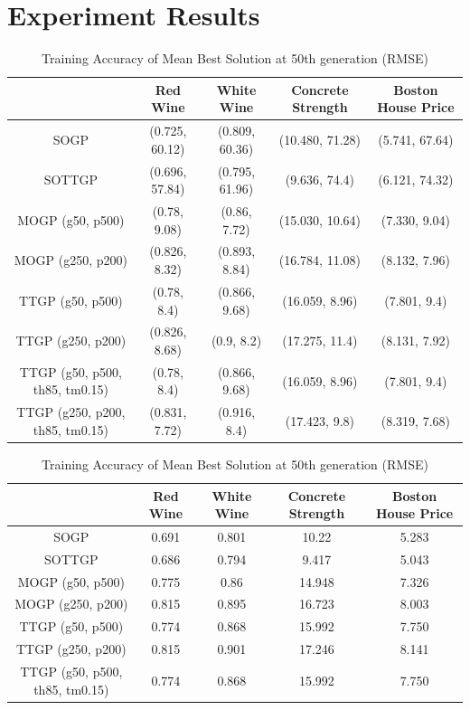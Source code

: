 \documentclass[a4paper, twocolumn]{article}
\begin{document}
\section{Experiment Results}
\begin{table}[!htb]
	\begin{center}
		\caption{Mean Best Solution at 50th generation (RMSE, tree size)}
		\label{table:1}
		\begin{tabular}{ c|cccc }
			& Red Wine & White Wine & Concrete Strength & Boston House Price\\
			\hline
			SOGP &(0.725, 60.12)&(0.809, 60.36)&(10.480, 71.28)&(5.741, 67.64)\\
			SOTTGP &(0.696, 57.84)&(0.795, 61.96)&(9.636, 74.4)&(6.121, 74.32)\\
			MOGP (g50, p500) &(0.78, 9.08)&(0.86, 7.72)&(15.030, 10.64)&(7.330, 9.04)\\
			MOGP (g250, p200) &(0.826, 8.32)&(0.893, 8.84)&(16.784, 11.08)&(8.132, 7.96)\\
			TTGP (g50, p500) &(0.78, 8.4)&(0.866, 9.68)&(16.059, 8.96)&(7.801, 9.4)\\
			TTGP (g250, p200) &(0.826, 8.68)&(0.9, 8.2)&(17.275, 11.4)&(8.131, 7.92)\\
			TTGP (g50, p500, th85, tm0.15) &(0.78, 8.4)&(0.866, 9.68)&(16.059, 8.96)&(7.801, 9.4)\\
			TTGP (g250, p200, th85, tm0.15) &(0.831, 7.72)&(0.916, 8.4)&(17.423, 9.8)&(8.319, 7.68)\\
		\end{tabular}
	\end{center}
	\begin{center}
		\caption{Training Accuracy of Mean Best Solution at 50th generation (RMSE)}
		\label{table:2}
		\begin{tabular}{ c|cccc }
			& Red Wine & White Wine & Concrete Strength & Boston House Price\\
			\hline
			SOGP &0.691&0.801&10.22&5.283\\
			SOTTGP &0.686&0.794&9.417&5.043\\
			MOGP (g50, p500) &0.775&0.86&14.948&7.326\\
			MOGP (g250, p200) &0.815&0.895&16.723&8.003\\
			TTGP (g50, p500) &0.774&0.868&15.992&7.750\\
			TTGP (g250, p200) &0.815&0.901&17.246&8.141\\
			TTGP (g50, p500, th85, tm0.15) &0.774&0.868&15.992&7.750\\

\end{tabular}
\end{center}
\end{table}
\end{document}
